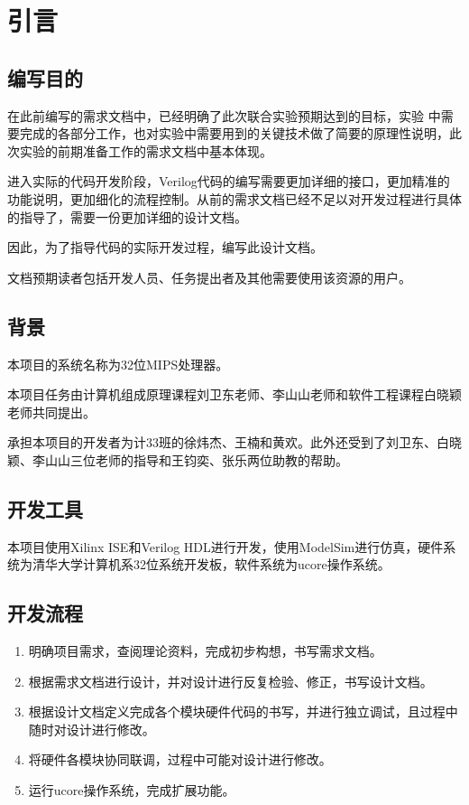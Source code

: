 \section{引言}
\subsection{编写目的}
在此前编写的需求文档中，已经明确了此次联合实验预期达到的目标，实验
中需要完成的各部分工作，也对实验中需要用到的关键技术做了简要的原理性说明，此次实验的前期准备工作的需求文档中基本体现。

进入实际的代码开发阶段，Verilog代码的编写需要更加详细的接口，更加精准的功能说明，更加细化的流程控制。从前的需求文档已经不足以对开发过程进行具体的指导了，需要一份更加详细的设计文档。

因此，为了指导代码的实际开发过程，编写此设计文档。

文档预期读者包括开发人员、任务提出者及其他需要使用该资源的用户。
\subsection{背景}
本项目的系统名称为32位MIPS处理器。

本项目任务由计算机组成原理课程刘卫东老师、李山山老师和软件工程课程白晓颖老师共同提出。

承担本项目的开发者为计33班的徐炜杰、王楠和黄欢。此外还受到了刘卫东、白晓颖、李山山三位老师的指导和王钧奕、张乐两位助教的帮助。
\subsection{开发工具}
本项目使用Xilinx ISE和Verilog HDL进行开发，使用ModelSim进行仿真，硬件系统为清华大学计算机系32位系统开发板，软件系统为ucore操作系统。
\subsection{开发流程}

\begin{enumerate}
	
	\item 明确项目需求，查阅理论资料，完成初步构想，书写需求文档。
	
	\item 根据需求文档进行设计，并对设计进行反复检验、修正，书写设计文档。
	
	\item 根据设计文档定义完成各个模块硬件代码的书写，并进行独立调试，且过程中随时对设计进行修改。
	
	\item 将硬件各模块协同联调，过程中可能对设计进行修改。
	
	\item 运行ucore操作系统，完成扩展功能。
	
\end{enumerate}
